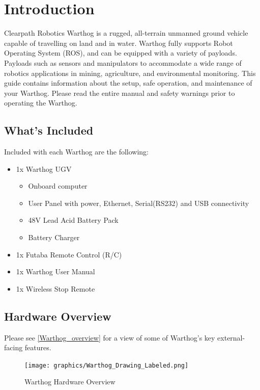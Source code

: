 \documentclass[]{clearpath-latex/clearpath-manual}
\begin{document}
\tableofcontents

\section{Introduction}
Clearpath Robotics Warthog is a rugged, all-terrain unmanned ground vehicle capable of travelling on land and in water.  Warthog fully supports Robot Operating System (ROS), and can be equipped with a variety of payloads. Payloads such as sensors and manipulators to accommodate a wide range of robotics applications in mining, agriculture, and environmental monitoring. This guide contains information about the setup, safe operation, and maintenance of your Warthog.  Please read the entire manual and safety warnings prior to operating the Warthog.

\subsection{What's Included}

Included with each Warthog are the following:

\begin{itemize}[nolistsep]
  \item 1x Warthog UGV
  \begin{itemize}
    \item{Onboard computer}
    \item{User Panel with power, Ethernet, Serial(RS232) and USB connectivity}
    \item{48V Lead Acid Battery Pack}
    \item{Battery Charger}
  \end{itemize}
  \item 1x Futaba Remote Control (R/C)
  \item 1x Warthog User Manual
  \item 1x Wireless Stop Remote
\end{itemize}



\pagebreak[4]
\subsection{Hardware Overview}

Please see \autoref{Warthog_overview} for a view of some of Warthog's key external-facing features.

\begin{figure}[h]
  \centering
  \texttt{[image: graphics/Warthog\_Drawing\_Labeled.png]}
  \caption{Warthog Hardware Overview}
  \label{Warthog_overview}
\end{figure}
\end{document}
